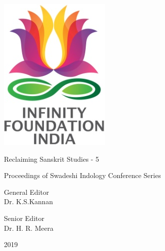 \thispagestyle{empty}

\includegraphics{images/logo.png}

Reclaiming Sanskrit Studies - 5


Proceedings of Swadeshi Indology Conference Series

General Editor\\ Dr. K.S.Kannan

Senior Editor\\ Dr. H. R. Meera


2019

